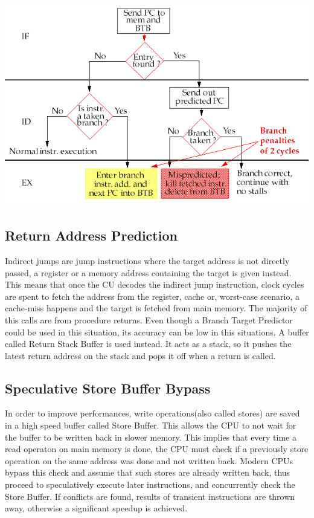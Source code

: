 \includegraphics[scale=0.35]{img/BTB.png}

\subsection{Return Address Prediction}
Indirect jumps are jump instructions where the target address is not directly passed, a register or a memory address containing the target is given instead.
This means that once the CU decodes the indirect jump instruction, clock cycles are spent to fetch the address from the register, cache or, worst-case scenario, a cache-miss happens and the target is fetched from main memory.
The majority of this calls are from procedure returns. Even though a Branch Target Predictor could be used in this situation, its accuracy can be low in this situations. A buffer called Return Stack Buffer is used instead. It acts as a stack, so it pushes the latest return address on the stack and pops it off when a return is called.

\subsection{Speculative Store Buffer Bypass}
In order to improve performances, write operations(also called stores) are saved in a high speed buffer called Store Buffer. This allows the CPU to not wait for the buffer to be written back in slower memory.
This implies that every time a read operaton on main memory is done, the CPU must check if a previously store operation on the same address was done and not written back. 
Modern CPUs bypass this check and assume that such stores are already written back, thus proceed to speculatively execute later instructions, and concurrently check the Store Buffer.
If conflicts are found, results of transient instructions are thrown away, otherwise a significant speedup is achieved.
